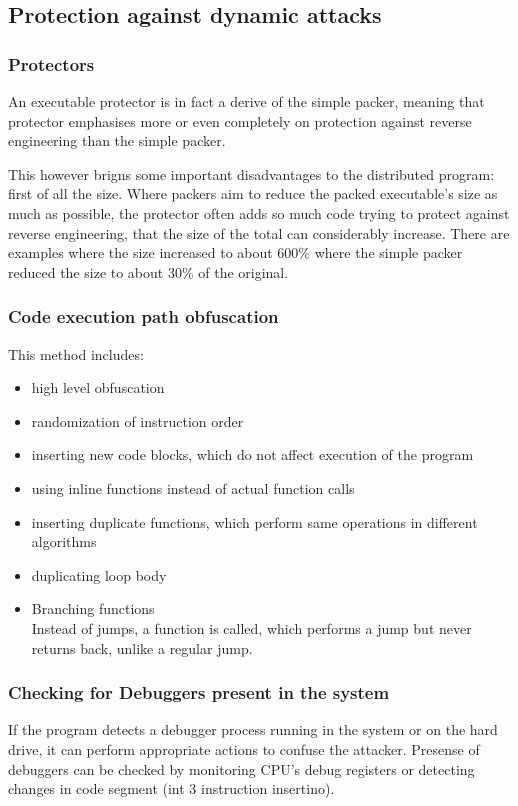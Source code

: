 \documentclass[a4paper,12pt]{article}
\begin{document}
\subsection{Protection against dynamic attacks}

\subsubsection{Protectors}
An executable protector is in fact a derive of the simple packer, meaning
that protector emphasises more or even completely on protection against
reverse engineering than the simple packer.

This however brigns some important disadvantages to the distributed
program: first of all the size. Where packers aim to reduce the packed
executable's size as much as possible, the protector often adds so much
code trying to protect against reverse engineering, that the size of the
total can considerably increase. There are examples where the size
increased to about 600\% where the simple packer reduced the size to about
30\% of the original.

\subsubsection{Code execution path obfuscation}
This method includes:
\begin{itemize}
\item high level obfuscation
\item randomization of instruction order
\item inserting new code blocks, which do not affect execution of the
    program
\item using inline functions instead of actual function calls
\item inserting duplicate functions, which perform same operations in
    different algorithms
\item duplicating loop body
\item Branching functions\\
    Instead of jumps, a function is called, which performs a jump but never
    returns back, unlike a regular jump.
\end{itemize}

\subsubsection{Checking for Debuggers present in the system}
If the program detects a debugger process running in the system or on the
hard drive, it can perform appropriate actions to confuse the attacker.
Presense of debuggers can be checked by monitoring CPU's debug registers
or detecting changes in code segment (int 3 instruction insertino).
\end{document}
